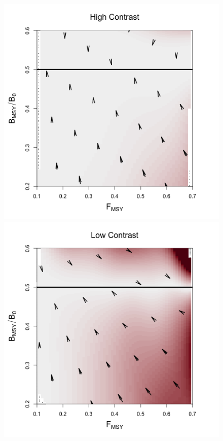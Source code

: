 \documentclass[ xcolor = pdftex, dvipsnames, table ]{beamer}
\begin{document}
%
\begin{frame}
\begin{figure}[h!]
\begin{minipage}[h!]{0.44\textwidth}
\includegraphics[width=\textwidth]{../../ptNew/directionalBiasSubPTExpT45MinCon.png}
\end{minipage}
\begin{minipage}[h!]{0.44\textwidth}
\includegraphics[width=\textwidth]{../../ptNew/directionalBiasSubPTFlatT30.png}

\end{minipage}
\end{figure}
\end{frame}
\end{document}
